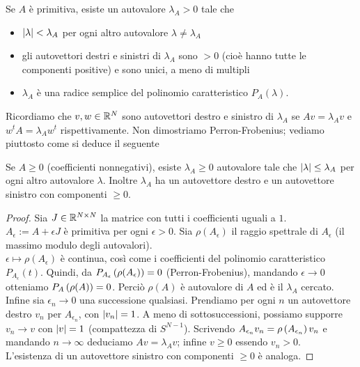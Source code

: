 \begin{teo}Se $A$ è primitiva, esiste un autovalore $\lambda_A>0$ tale che
\begin{itemize}
	\item $\left|\lambda\right|<\lambda_A$ per ogni altro autovalore $\lambda\neq\lambda_A$
	\item gli autovettori destri e sinistri di $\lambda_A$ sono $>0$ (cioè hanno tutte le componenti positive) e sono unici, a meno di multipli
	\item $\lambda_A$ è una radice semplice del polinomio caratteristico $P_A(\lambda)$.
\end{itemize}
\end{teo}

Ricordiamo che $v,w\in\mathbb{R}^N$ sono autovettori destro e sinistro di $\lambda_A$ se $Av=\lambda_A v$ e $w^t A=\lambda_A w^t$ rispettivamente.
Non dimostriamo Perron-Frobenius; vediamo piuttosto come si deduce il seguente

\begin{cor}Se $A\ge 0$ (coefficienti nonnegativi), esiste $\lambda_A\ge 0$ autovalore tale che
$\left|\lambda\right|\le \lambda_A$ per ogni altro autovalore $\lambda$. Inoltre $\lambda_A$ ha un autovettore destro e un autovettore sinistro
con componenti $\ge 0$.
\end{cor}

\begin{proof}Sia $J\in\mathbb{R}^{N\times N}$ la matrice con tutti i coefficienti uguali a $1$. \\
$A_\epsilon:=A+\epsilon J$ è primitiva per ogni $\epsilon>0$. Sia $\rho(A_\epsilon)$ il raggio spettrale di $A_\epsilon$
(il massimo modulo degli autovalori). \\
$\epsilon\mapsto\rho(A_\epsilon)$ è continua, così come i coefficienti del polinomio caratteristico $P_{A_\epsilon}(t)$.
Quindi, da $P_{A_\epsilon}\left(\rho(A_\epsilon)\right)=0$ (Perron-Frobenius), mandando $\epsilon\to 0$ otteniamo $P_A\left(\rho(A)\right)=0$.
Perciò $\rho(A)$ è autovalore di $A$ ed è il $\lambda_A$ cercato. \\
Infine sia $\epsilon_n\to 0$ una successione qualsiasi. Prendiamo per ogni $n$ un autovettore destro $v_n$
per $A_{\epsilon_n}$, con $\left|v_n\right|=1$. A meno di sottosuccessioni, possiamo supporre $v_n\to v$ con $\left|v\right|=1$
(compattezza di $S^{N-1}$). Scrivendo $A_{\epsilon_n}v_n=\rho\left(A_{\epsilon_n}\right)v_n$ e mandando $n\to\infty$ deduciamo
$Av=\lambda_A v$; infine $v\ge 0$ essendo $v_n>0$. \\
L'esistenza di un autovettore sinistro con componenti $\ge 0$ è analoga.
\end{proof}

